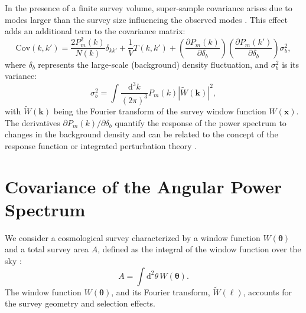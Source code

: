 In the presence of a finite survey volume, super-sample covariance arises due to modes larger than the survey size influencing the observed modes \citep{PhysRevD.87.123504}. This effect adds an additional term to the covariance matrix:
\begin{equation}
    \mathrm{Cov}(k, k') = \frac{2 P_m^2(k)}{N(k)} \delta_{kk'} + \frac{1}{V} T(k, k') + \left( \frac{\partial P_m(k)}{\partial \delta_b} \right) \left( \frac{\partial P_m(k')}{\partial \delta_b} \right) \sigma_b^2,
\end{equation}
where \( \delta_b \) represents the large-scale (background) density fluctuation, and \( \sigma_b^2 \) is its variance:
\begin{equation}
    \sigma_b^2 = \int \frac{\mathrm{d}^3 k}{(2\pi)^3} P_m(k) |\tilde{W}(\mathbf{k})|^2,
\end{equation}
with \( \tilde{W}(\mathbf{k}) \) being the Fourier transform of the survey window function \( W(\mathbf{x}) \).
The derivatives \( \partial P_m(k) / \partial \delta_b \) quantify the response of the power spectrum to changes in the background density and can be related to the concept of the response function or integrated perturbation theory \citep{2014PhRvD..89h3519L}.

\section{Covariance of the Angular Power Spectrum}
We consider a cosmological survey characterized by a window function \( W(\boldsymbol{\theta}) \) and a total survey area \( A \), defined as the integral of the window function over the sky \citep{PhysRevD.87.123504}:
\begin{equation}
    A = \int \mathrm{d}^2 \theta \, W(\boldsymbol{\theta}).
\end{equation}
The window function \( W(\boldsymbol{\theta}) \), and its Fourier transform, \( \tilde{W}(\boldsymbol{\ell}) \), accounts for the survey geometry and selection effects. 

